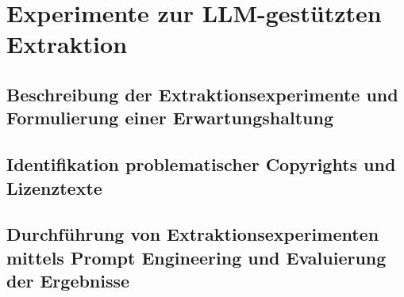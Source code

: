 \chapter{Experimente zur LLM-gestützten Extraktion}\label{ch:prompt-engineering}

\section{Beschreibung der Extraktionsexperimente und Formulierung einer
Erwartungshaltung}

\section{Identifikation problematischer Copyrights und Lizenztexte}

\section{Durchführung von Extraktionsexperimenten mittels Prompt Engineering und
Evaluierung der Ergebnisse}
